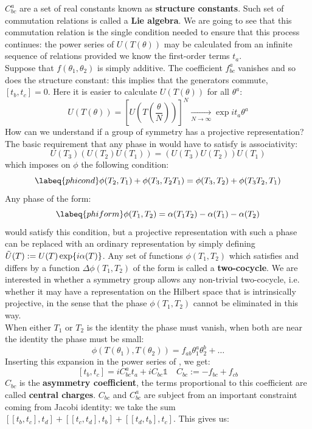 \documentclass[../main.tex]{subfiles}
\begin{document}
$C^a_{bc}$ are a set of real constants known as \textbf{structure constants}. Such set of commutation relations is called a \textbf{Lie algebra}. We are going to see that this commutation relation is the single condition needed to ensure that this process continues: the power series of $U(T(\theta))$ may be calculated from an infinite sequence of relations provided we know the first-order terms $t_a$.\\
Suppose that $f(\theta_1,\theta_2)$ is simply additive. The coefficient $f^a_{bc}$ vanishes and so does the structure constant: this implies that the generators commute, $[t_b,t_c]=0$. Here it is easier to calculate $U(T(\theta))$ for all $\theta^a$:
\[
U(T(\theta))=\left[U\left(T\left(\frac{\theta}{N}\right)\right)\right]^N\xrightarrow[N\to\infty]{}\exp{it_a\theta^a}
\]
How can we understand if a group of symmetry has a projective representation? The basic requirement that any phase in  would have to satisfy is associativity:
\[
U(T_3)(U(T_2)U(T_1))=(U(T_3)U(T_2))U(T_1)
\]
which imposes on $\phi$ the following condition:
\begin{equation}
\labeq{phicond}
\phi(T_2,T_1)+\phi(T_3,T_2T_1)=\phi(T_3,T_2)+\phi(T_3T_2,T_1)
\end{equation}
Any phase of the form:
\begin{equation}
\labeq{phiform}
\phi(T_1,T_2)=\alpha(T_1T_2)-\alpha(T_1)-\alpha(T_2)
\end{equation}
would satisfy this condition, but a projective representation with such a phase can be replaced with an ordinary representation by simply defining \\
$\Tilde{U}(T):=U(T)\exp{i\alpha(T)}$. Any set of functions $\phi(T_1,T_2)$ which satisfies  and differs by a function $\Delta\phi(T_1,T_2)$ of the form  is called a \textbf{two-cocycle}. We are interested in whether a symmetry group allows any non-trivial two-cocycle, i.e. whether it may have a representation on the Hilbert space that is intrinsically projective, in the sense that the phase $\phi(T_1,T_2)$ cannot be eliminated in this way.\\
When either $T_1$ or $T_2$ is the identity the phase must vanish, when both are near the identity the phase must be small:
\[
\phi(T(\theta_1),T(\theta_2))=f_{ab}\theta_1^a\theta_2^b+\dots
\]
Inserting this expansion in the power series of , we get:
\[
[t_b,t_c]=iC^a_{bc}t_a+iC_{bc}\mathbb{1} \quad C_{bc}:=-f_{bc}+f_{cb}
\]
$C_{bc}$ is the \textbf{asymmetry coefficient}, the terms proportional to this coefficient are called \textbf{central charges}. $C_{bc}$ and $C_{bc}^a$ are subject from an important constraint coming from Jacobi identity: we take the sum $[[t_b,t_c],t_d]+[[t_c,t_d],t_b]+[[t_d,t_b],t_c]$. This gives us:
\end{document}

